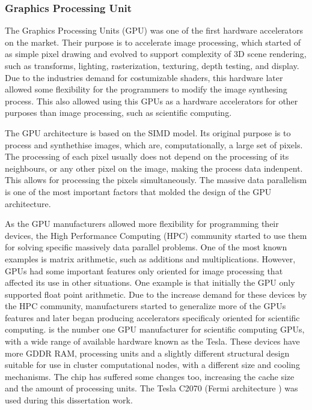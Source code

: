 \subsubsection*{Graphics Processing Unit}
\label{GPU}

The Graphics Processing Units (GPU) was one of the first hardware accelerators on the market. Their purpose is to accelerate image processing, which started of as simple pixel drawing and evolved to support complexity of 3D scene rendering, such as transforms, lighting, rasterization, texturing, depth testing, and display. Due to the industries demand for costumizable shaders, this hardware later allowed some flexibility for the programmers to modify the image synthesing process. This also allowed using this GPUs as a hardware accelerators for other purposes than image processing, such as scientific computing.

The GPU architecture is based on the SIMD model. Its original purpose is to process and synthethise images, which are, computationally, a large set of pixels. The processing of each pixel usually does not depend on the processing of its neighbours, or any other pixel on the image, making the process data indenpent. This allows for processing the pixels simultaneously. The massive data parallelism is one of the most important factors that molded the design of the GPU architecture.

As the GPU manufacturers allowed more flexibility for programming their devices, the High Performance Computing (HPC) community started to use them for solving specific massively data parallel problems. One of the most known examples is matrix arithmetic, such as additions and multiplications. However, GPUs had some important features only oriented for image processing that affected its use in other situations. One example is that initially the GPU only supported float point arithmetic. Due to the increase demand for these devices by the HPC community, manufacturers started to generalize more of the GPUs features and later began producing accelerators specificaly oriented for scientific computing. \nvidia is the number one GPU manufacturer for scientific computing GPUs, with a wide range of available hardware known as the Tesla. These devices have more GDDR RAM, processing units and a slightly different structural design suitable for use in cluster computational nodes, with a different size and cooling mechanisms. The chip has suffered some changes too, increasing the cache size and the amount of processing units. The \nvidia Tesla C2070 (Fermi architecture \cite{NVIDIA:Fermi}) was used during this dissertation work.

